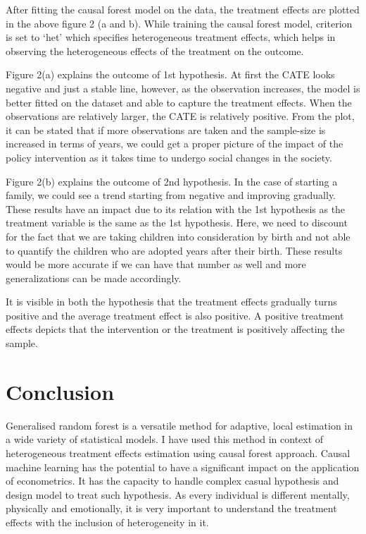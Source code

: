 \documentclass[11pt, a4paper, leqno]{article}
\begin{document}
After fitting the causal forest model on the data, the treatment effects are plotted in the above figure 2 (a and b).
While training the causal forest model, criterion is set to `het' which specifies heterogeneous treatment effects, which helps in observing the heterogeneous effects of the
treatment on the outcome.

Figure 2(a) explains the outcome of 1st hypothesis. At first the CATE looks negative and just a stable line, however, as the observation increases,
 the model is better fitted on the dataset and able to capture the treatment effects. When the observations are relatively larger, the CATE is
 relatively positive. From the plot, it can be stated that if more observations are taken and the sample-size is increased in terms of years, we could
 get a proper picture of the impact of the policy intervention as it takes time to undergo social changes in the society.

Figure 2(b) explains the outcome of 2nd hypothesis. In the case of starting a family, we could see a trend starting from negative and improving
gradually. These results have an impact due to its relation with the 1st hypothesis as the treatment variable is the same as the 1st hypothesis.
Here, we need to discount for the fact that we are taking children into consideration by birth and not able to quantify the children who are adopted
years after their birth. These results would be more accurate if we can have that number as well and more generalizations can be made accordingly.

It is visible in both the hypothesis that the treatment effects gradually turns positive and the average treatment effect is also positive. A
positive treatment effects depicts that the intervention or the treatment is positively affecting the sample.

\section{Conclusion} %
\label{sec:Conclusion}

Generalised random forest is a versatile method for adaptive, local estimation in a wide variety of statistical models. I have used this method
in context of heterogeneous treatment effects estimation using causal forest approach. Causal machine learning has the potential to have a
significant impact on the application of econometrics. It has the capacity to handle complex casual hypothesis and design model to treat such
hypothesis. As every individual is different mentally, physically and emotionally, it is very important to understand the treatment effects with
the inclusion of heterogeneity in it.
\end{document}
